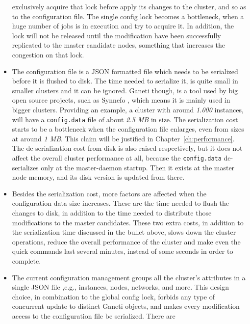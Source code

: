 \begin{itemize}
        exclusively acquire that lock before apply its changes to the cluster,
        and so as to the configuration file. The single config lock becomes a
        bottleneck, when a huge number of jobs is in execution and try to
        acquire it. In addition, the lock will not be released until the
        modification have been successfully replicated to the master candidate
        nodes, something that increases the congestion on that lock.
  \item The configuration file is a JSON formatted file which needs to be
        serialized before it is flushed to disk. The time needed to serialize
        it, is quite small in smaller clusters and it can be ignored. Ganeti
        though, is a tool used by big open source projects, such as Synnefo
        , which means it is mainly used in bigger
        clusters. Providing an example, a cluster with around \emph{1.000}
        instances, will have a \texttt{config.data} file of about \emph{2.5 MB}
        in size. The serialization cost starts to be a bottleneck when the
        configuration file enlarges, even from sizes at around \emph{1 MB}. This
        claim will be justified in Chapter~\ref{ch:performance}. The
        de-serialization cost from disk is also raised respectively, but it does
        not affect the overall cluster performance at all, because the
        \texttt{config.data} de-serializes only at the master-daemon startup.
        Then it exists at the master node memory, and its disk version is
        updated from there.
  \item Besides the serialization cost, more factors are affected when the
        configuration data size increases. These are the time needed to
        flush the changes to disk, in addition to the time needed to distribute
        those modifications to the master candidates. These two extra costs, in
        addition to the serialization time discussed in the bullet above, slows
        down the cluster operations, reduce the overall performance of the
        cluster and make even the quick commands last several minutes,
        instead of some seconds in order to complete.
  \item The current configuration management groups all the cluster's attributes
        in a single JSON file ,e.g., instances, nodes, networks, and more. This
        design choice, in combination to the global config lock, forbids any
        type of concurrent update to distinct Ganeti objects, and makes every
        modification access to the configuration file be serialized. There are

\end{itemize}
